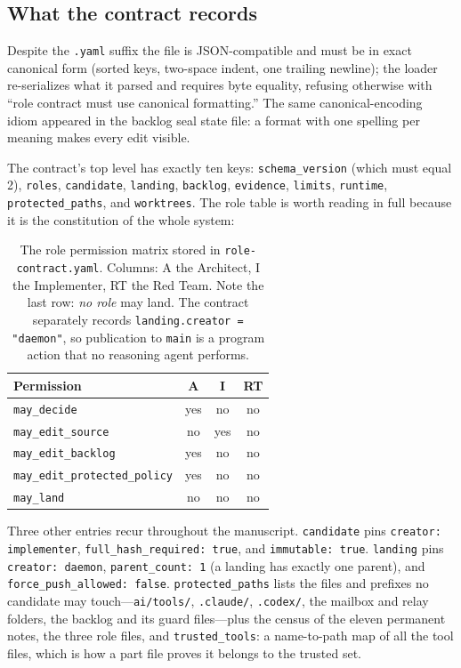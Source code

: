 \documentclass[10pt,aps,prd,twocolumn,nofootinbib]{revtex4-2}
\newcommand{\code}[1]{\texttt{#1}}
\newcommand{\file}[1]{\texttt{#1}}
\begin{document}
\subsection{What the contract records}

Despite the \file{.yaml} suffix the file is JSON-compatible and must be
in exact canonical form (sorted keys, two-space indent, one trailing
newline); the loader re-serializes what it parsed and requires byte
equality, refusing otherwise with ``role contract must use canonical
formatting.''  The same canonical-encoding idiom appeared in the
backlog seal state file: a format with one spelling per meaning makes
every edit visible.

The contract's top level has exactly ten keys: \code{schema\_version}
(which must equal 2), \code{roles}, \code{candidate}, \code{landing},
\code{backlog}, \code{evidence}, \code{limits}, \code{runtime},
\code{protected\_paths}, and \code{worktrees}.  The role table is worth
reading in full because it is the constitution of the whole system:

\begin{table}[t]
\centering
\small
\setlength{\tabcolsep}{3.5pt}
\begin{tabular}{lccc}
\toprule
Permission & A & I & RT \\
\midrule
\code{may\_decide} & yes & no & no \\
\code{may\_edit\_source} & no & yes & no \\
\code{may\_edit\_backlog} & yes & no & no \\
\code{may\_edit\_protected\_policy} & yes & no & no \\
\code{may\_land} & no & no & no \\
\bottomrule
\end{tabular}
\caption{The role permission matrix stored in
\file{role-contract.yaml}.  Columns: A the Architect, I the
Implementer, RT the Red Team.  Note the last row: \emph{no role} may
land.  The contract separately records
\code{landing.creator = "daemon"}, so publication to \code{main} is a
program action that no reasoning agent performs.}
\label{tab:role-matrix}
\end{table}

Three other entries recur throughout the manuscript.
\code{candidate} pins \code{creator: implementer},
\code{full\_hash\_required: true}, and \code{immutable: true}.
\code{landing} pins \code{creator: daemon},
\code{parent\_count: 1} (a landing has exactly one parent), and
\code{force\_push\_allowed: false}.  \code{protected\_paths} lists the
files and prefixes no candidate may touch---\file{ai/tools/},
\file{.claude/}, \file{.codex/}, the mailbox and relay folders, the
backlog and its guard files---plus the census of the eleven permanent
notes, the three role files, and \code{trusted\_tools}: a name-to-path
map of all the tool files, which is how a part file proves it
belongs to the trusted set.
\end{document}

